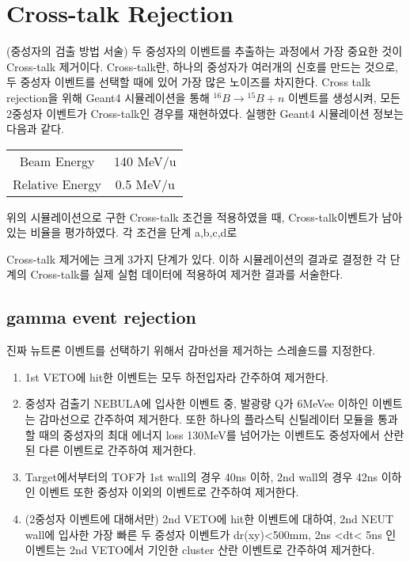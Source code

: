 \section{Cross-talk Rejection}
(중성자의 검출 방법 서술) 두 중성자의 이벤트를 추출하는 과정에서 가장 중요한 것이 Cross-talk 제거이다. Cross-talk란, 하나의 중성자가 여러개의 신호를 만드는 것으로, 두 중성자 이벤트를 선택할 때에 있어 가장 많은 노이즈를 차지한다. 
Cross talk rejection을 위해 Geant4 시뮬레이션을 통해 ${}^{16}B\to{}^{15}B+n$ 이벤트를 생성시켜, 모든 2중성자 이벤트가 Cross-talk인 경우를 재현하였다. 실행한 Geant4 시뮬레이션 정보는 다음과 같다.
\begin{center}
    \begin{tabular}[h]{c|c}
        \hline
        Beam Energy & 140 MeV/u\\
        Relative Energy & 0.5 MeV/u\\
        \hline
    \end{tabular}
\end{center}


위의 시뮬레이션으로 구한 Cross-talk 조건을 적용하였을 때, Cross-talk이벤트가 남아있는 비율을 평가하였다. 각 조건을 단계 a,b,c,d로 

Cross-talk 제거에는 크게 3가지 단계가 있다. 
이하 시뮬레이션의 결과로 결정한 각 단계의 Cross-talk를 실제 실험 데이터에 적용하여 제거한 결과를 서술한다.
\subsection{gamma event rejection}
진짜 뉴트론 이벤트를 선택하기 위해서 감마선을 제거하는 스레숄드를 지정한다.
\begin{enumerate}
    \item 1st VETO에 hit한 이벤트는 모두 하전입자라 간주하여 제거한다.
    \item 중성자 검출기 NEBULA에 입사한 이벤트 중, 발광량 Q가 6MeVee 이하인 이벤트는 감마선으로 간주하여 제거한다. 또한 하나의 플라스틱 신틸레이터 모듈을 통과할 때의 중성자의 최대 에너지 loss 130MeV를 넘어가는 이벤트도 중성자에서 산란된 다른 이벤트로 간주하여 제거한다.
    \item Target에서부터의 TOF가 1st wall의 경우 40ns 이하, 2nd wall의 경우 42ns 이하인 이벤트 또한 중성자 이외의 이벤트로 간주하여 제거한다.
    \item (2중성자 이벤트에 대해서만) 2nd VETO에 hit한 이벤트에 대하여, 2nd NEUT wall에 입사한 가장 빠른 두 중성자 이벤트가 dr(xy)<500mm, 2ns <dt< 5ns 인 이벤트는 2nd VETO에서 기인한 cluster 산란 이벤트로 간주하여 제거한다.
\end{enumerate}
